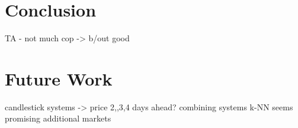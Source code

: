 



\section{Conclusion}
TA - not much cop -> b/out good

\section{Future Work}
candlestick systems -> price 2,,3,4 days ahead?
combining systems
k-NN seems promising
additional markets
